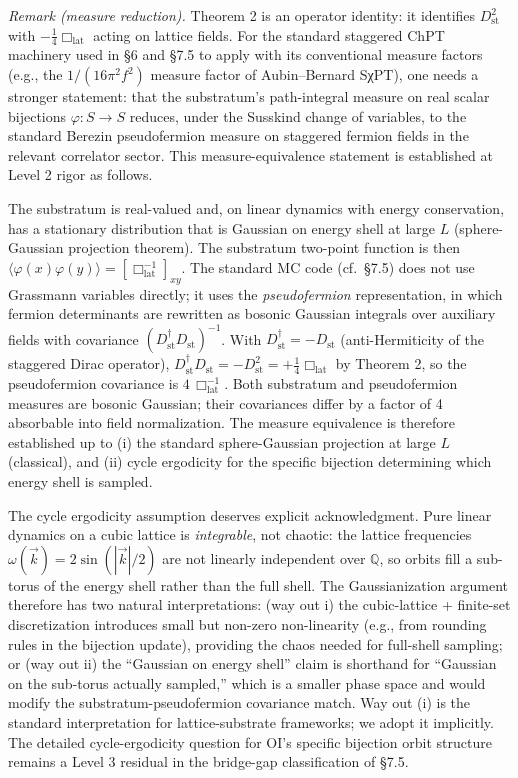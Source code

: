 \documentclass[
]{article}
\begin{document}
\emph{Remark (measure reduction).} Theorem 2 is an operator identity: it
identifies \(D_{\text{st}}^2\) with \(-\tfrac14\Box_{\text{lat}}\)
acting on lattice fields. For the standard staggered ChPT machinery used
in §6 and §7.5 to apply with its conventional measure factors (e.g., the
\(1/(16\pi^2 f^2)\) measure factor of Aubin--Bernard SχPT), one needs a
stronger statement: that the substratum's path-integral measure on real
scalar bijections \(\varphi: S \to S\) reduces, under the Susskind
change of variables, to the standard Berezin pseudofermion measure on
staggered fermion fields in the relevant correlator sector. This
measure-equivalence statement is established at Level 2 rigor as
follows.

The substratum is real-valued and, on linear dynamics with energy
conservation, has a stationary distribution that is Gaussian on energy
shell at large \(L\) (sphere-Gaussian projection theorem). The
substratum two-point function is then
\(\langle \varphi(x)\varphi(y) \rangle = [\Box_{\text{lat}}^{-1}]_{xy}\).
The standard MC code (cf.~§7.5) does not use Grassmann variables
directly; it uses the \emph{pseudofermion} representation, in which
fermion determinants are rewritten as bosonic Gaussian integrals over
auxiliary fields with covariance
\((D_{\text{st}}^\dagger D_{\text{st}})^{-1}\). With
\(D_{\text{st}}^\dagger = -D_{\text{st}}\) (anti-Hermiticity of the
staggered Dirac operator),
\(D_{\text{st}}^\dagger D_{\text{st}} = -D_{\text{st}}^2 = +\tfrac14\Box_{\text{lat}}\)
by Theorem 2, so the pseudofermion covariance is
\(4\,\Box_{\text{lat}}^{-1}\). Both substratum and pseudofermion
measures are bosonic Gaussian; their covariances differ by a factor of 4
absorbable into field normalization. The measure equivalence is
therefore established up to (i) the standard sphere-Gaussian projection
at large \(L\) (classical), and (ii) cycle ergodicity for the specific
bijection determining which energy shell is sampled.

The cycle ergodicity assumption deserves explicit acknowledgment. Pure
linear dynamics on a cubic lattice is \emph{integrable}, not chaotic:
the lattice frequencies \(\omega(\vec{k}) = 2\sin(|\vec{k}|/2)\) are not
linearly independent over \(\mathbb{Q}\), so orbits fill a sub-torus of
the energy shell rather than the full shell. The Gaussianization
argument therefore has two natural interpretations: (way out i) the
cubic-lattice + finite-set discretization introduces small but non-zero
non-linearity (e.g., from rounding rules in the bijection update),
providing the chaos needed for full-shell sampling; or (way out ii) the
``Gaussian on energy shell'' claim is shorthand for ``Gaussian on the
sub-torus actually sampled,'' which is a smaller phase space and would
modify the substratum-pseudofermion covariance match. Way out (i) is the
standard interpretation for lattice-substrate frameworks; we adopt it
implicitly. The detailed cycle-ergodicity question for OI's specific
bijection orbit structure remains a Level 3 residual in the bridge-gap
classification of §7.5.
\end{document}
